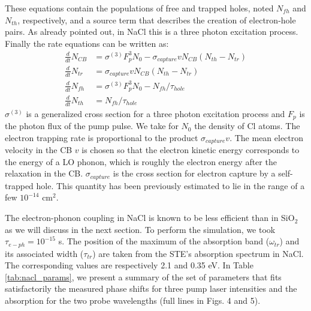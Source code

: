 \documentclass[aps,prb,reprint]{revtex4-2}
\begin{document}
These equations contain the populations of free and trapped holes, noted $N_{fh}$ and $N_{th}$, respectively, and a source term that describes the creation of electron-hole pairs. As already pointed out, in NaCl this is a three photon excitation process. Finally the rate equations can be written as:
\begin{align}
\frac{d}{dt} N_{CB} &= \sigma^{(3)} F_p^3 N_0 - \sigma_{capture} v N_{CB} (N_{th} - N_{tr}) \\
\frac{d}{dt} N_{tr} &= \sigma_{capture} v N_{CB} (N_{th} - N_{tr}) \\
\frac{d}{dt} N_{fh} &= \sigma^{(3)} F_p^3 N_0 - N_{fh} / \tau_{hole} \\
\frac{d}{dt} N_{th} &= N_{fh} / \tau_{hole}
\end{align}
 $\sigma^{(3)}$ is a generalized cross section for a three photon excitation process and $F_p$ is the photon flux of the pump pulse. We take for $N_0$ the density of Cl atoms. The electron trapping rate is proportional to the product $\sigma_{capture} v$. The mean electron velocity in the CB $v$ is chosen so that the electron kinetic energy corresponds to the energy of a LO phonon, which is roughly the electron energy after the relaxation in the CB.\cite{15,23} $\sigma_{capture}$ is the cross section for electron capture by a self-trapped hole. This quantity has been previously estimated to lie in the range of a few $10^{-14}$ cm$^2$.\cite{21,24}

The electron-phonon coupling in NaCl is known to be less efficient than in SiO$_2$ as we will discuss in the next section. To perform the simulation, we took $\tau_{e-ph} = 10^{-15}$ s. The position of the maximum of the absorption band ($\omega_{tr}$) and its associated width ($\tau_{tr}$) are taken from the STE's absorption spectrum in NaCl.\cite{15} The corresponding values are respectively 2.1 and 0.35 eV. In Table \ref{tab:nacl_params}, we present a summary of the set of parameters that fits satisfactorily the measured phase shifts for three pump laser intensities and the absorption for the two probe wavelengths (full lines in Figs. 4 and 5).
\end{document}
